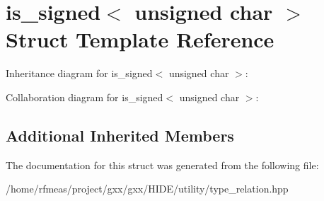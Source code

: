\hypertarget{structis__signed_3_01unsigned_01char_01_4}{}\section{is\+\_\+signed$<$ unsigned char $>$ Struct Template Reference}
\label{structis__signed_3_01unsigned_01char_01_4}


Inheritance diagram for is\+\_\+signed$<$ unsigned char $>$\+:


Collaboration diagram for is\+\_\+signed$<$ unsigned char $>$\+:
\subsection*{Additional Inherited Members}


The documentation for this struct was generated from the following file\+:\begin{DoxyCompactItemize}
\item 
/home/rfmeas/project/gxx/gxx/\+H\+I\+D\+E/utility/type\+\_\+relation.\+hpp\end{DoxyCompactItemize}
